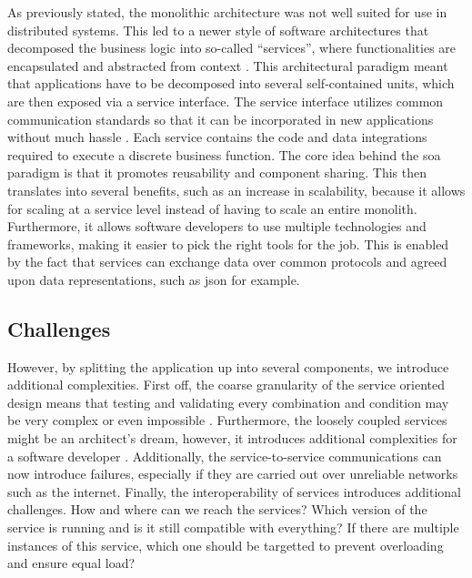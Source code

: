
As previously stated, the \gls{monolith}ic architecture was not well suited for use in distributed systems. This led to a newer style of software architectures that decomposed the business logic into so-called “services”, where functionalities are encapsulated and abstracted from context \cite{perrey2003service}. This architectural paradigm meant that applications have to be decomposed into several self-contained units, which are then exposed via a service interface. The service interface utilizes common communication standards so that it can be incorporated in new applications without much hassle \cite{ibm-soa}. Each service contains the code and data integrations required to execute a discrete business function. The core idea behind the \gls{soa} paradigm is that it promotes reusability and component sharing. This then translates into several benefits, such as an increase in scalability, because it allows for scaling at a service level instead of having to scale an entire monolith. Furthermore, it allows software developers to use multiple technologies and frameworks, making it easier to pick the right tools for the job. This is enabled by the fact that services can exchange data over common protocols and agreed upon data representations, such as \gls{json} for example.



\subsection{Challenges}
However, by splitting the application up into several components, we introduce additional complexities. First off, the coarse granularity of the service oriented design means that testing and validating every combination and condition may be very complex or even impossible \cite{mahmood2007service}. Furthermore, the loosely coupled services might be an architect's dream, however, it introduces additional complexities for a software developer \cite{fowler2012patterns}. Additionally, the service-to-service communications can now introduce failures, especially if they are carried out over unreliable networks such as the internet. Finally, the interoperability of services introduces additional challenges. How and where can we reach the services? Which version of the service is running and is it still compatible with everything? If there are multiple instances of this service, which one should be targetted to prevent overloading and ensure equal load? 

